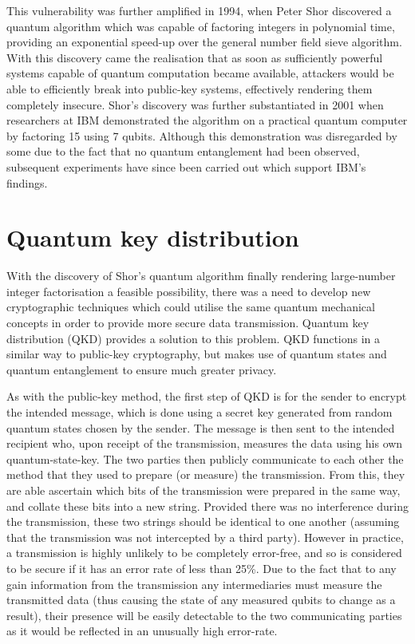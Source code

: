 \documentclass[runningheads,a4paper]{llncs}
\begin{document}
This vulnerability was further amplified in 1994, when Peter Shor discovered a quantum algorithm which was capable of factoring integers in polynomial time, providing an exponential speed-up over the general number field sieve algorithm\cite{Shor:1994fk}. With this discovery came the realisation that as soon as sufficiently powerful systems capable of quantum computation became available, attackers would be able to efficiently break into public-key systems, effectively rendering them completely insecure. Shor's discovery was further substantiated in 2001 when researchers at IBM demonstrated the algorithm on a practical quantum computer by factoring 15 using 7 qubits\cite{Vandersypen:2001fk}. Although this demonstration was disregarded by some due to the fact that no quantum entanglement had been observed, subsequent experiments have since been carried out which support IBM's findings\cite{Lu:2007uq}.

\section{Quantum key distribution}

With the discovery of Shor's quantum algorithm finally rendering large-number integer factorisation a feasible possibility, there was a need to develop new cryptographic techniques which could utilise the same quantum mechanical concepts in order to provide more secure data transmission. Quantum key distribution (QKD) provides a solution to this problem. QKD functions in a similar way to public-key cryptography, but makes use of quantum states and quantum entanglement to ensure much greater privacy.

As with the public-key method, the first step of QKD is for the sender to encrypt the intended message, which is done using a secret key generated from random quantum states chosen by the sender. The message is then sent to the intended recipient who, upon receipt of the transmission, measures the data using his own quantum-state-key. The two parties then publicly communicate to each other the method that they used to prepare (or measure) the transmission. From this, they are able ascertain which bits of the transmission were prepared in the same way, and collate these bits into a new string. Provided there was no interference during the transmission, these two strings should be identical to one another (assuming that the transmission was not intercepted by a third party). However in practice, a transmission is highly unlikely to be completely error-free, and so is considered to be secure if it has an error rate of less than 25\%\cite{Steane:1997zr}. Due to the fact that to any gain information from the transmission any intermediaries must measure the transmitted data (thus causing the state of any measured qubits to change as a result),  their presence will be easily detectable to the two communicating parties as it would be reflected in an unusually high error-rate.
\end{document}
